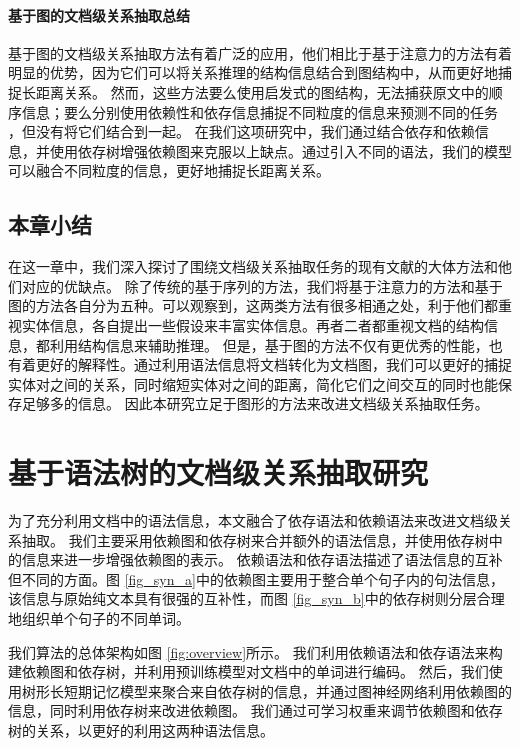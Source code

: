 \documentclass[bachelor]{thesis-uestc}
\begin{document}
\subsubsection{基于图的文档级关系抽取总结}\label{subsec:graph-neural-network}

基于图的文档级关系抽取方法有着广泛的应用，他们相比于基于注意力的方法有着明显的优势，因为它们可以将关系推理的结构信息结合到图结构中，从而更好地捕捉长距离关系。
然而，这些方法要么使用启发式的图结构，无法捕获原文中的顺序信息\cite{GAIN, Xu2020DocumentLevelRE}；要么分别使用依赖性和依存信息捕捉不同粒度的信息来预测不同的任务 \cite{SagDRE, duan-etal-2022-just}，但没有将它们结合到一起。
在我们这项研究中，我们通过结合依存和依赖信息，并使用依存树增强依赖图来克服以上缺点。通过引入不同的语法，我们的模型可以融合不同粒度的信息，更好地捕捉长距离关系。

\section{本章小结}

在这一章中，我们深入探讨了围绕文档级关系抽取任务的现有文献的大体方法和他们对应的优缺点。
除了传统的基于序列的方法，我们将基于注意力的方法和基于图的方法各自分为五种。可以观察到，这两类方法有很多相通之处，利于他们都重视实体信息，各自提出一些假设来丰富实体信息。再者二者都重视文档的结构信息，都利用结构信息来辅助推理。
但是，基于图的方法不仅有更优秀的性能，也有着更好的解释性。通过利用语法信息将文档转化为文档图，我们可以更好的捕捉实体对之间的关系，同时缩短实体对之间的距离，简化它们之间交互的同时也能保存足够多的信息。
因此本研究立足于图形的方法来改进文档级关系抽取任务。


\chapter{基于语法树的文档级关系抽取研究}
为了充分利用文档中的语法信息，本文融合了依存语法和依赖语法来改进文档级关系抽取。
我们主要采用依赖图和依存树来合并额外的语法信息，并使用依存树中的信息来进一步增强依赖图的表示。
依赖语法和依存语法描述了语法信息的互补但不同的方面。图 \ref{fig_syn_a}中的依赖图主要用于整合单个句子内的句法信息，该信息与原始纯文本具有很强的互补性，而图 \ref{fig_syn_b}中的依存树则分层合理地组织单个句子的不同单词。\par

我们算法的总体架构如图 \ref{fig:overview}所示。
我们利用依赖语法和依存语法来构建依赖图和依存树，并利用预训练模型对文档中的单词进行编码。
然后，我们使用树形长短期记忆模型来聚合来自依存树的信息，并通过图神经网络利用依赖图的信息，同时利用依存树来改进依赖图。
我们通过可学习权重来调节依赖图和依存树的关系，以更好的利用这两种语法信息。
\end{document}
